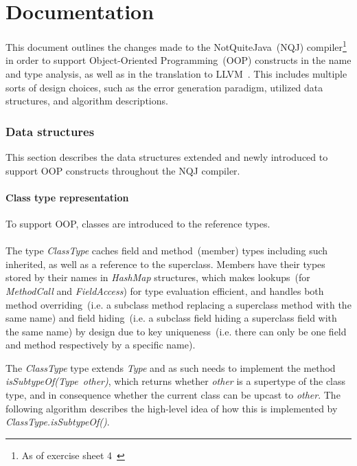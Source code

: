 \documentclass[]{tukportfolio}
\begin{document}

\part*{Documentation}

This document outlines the changes made to the NotQuiteJava~(NQJ) compiler\footnote{
  As of exercise sheet 4~\cite{clp4solution}
} in order to support Object-Oriented Programming~(OOP) constructs in the name and type analysis, as well as in the translation to LLVM~\cite{llvmpage}. This includes multiple sorts of design choices, such as the error generation paradigm, utilized data structures, and algorithm descriptions.

\section{Data structures}

This section describes the data structures extended and newly introduced to support OOP constructs throughout the NQJ compiler.

\subsection{Class type representation}

To support OOP, classes are introduced to the reference types.
\\
\\
The type \textit{ClassType} caches field and method~(member) types including such inherited, as well as a reference to the superclass. Members have their types stored by their names in \textit{HashMap} structures, which makes lookups~(for \textit{MethodCall} and \textit{FieldAccess}) for type evaluation efficient, and handles both method overriding~(i.e. a subclass method replacing a superclass method with the same name) and field hiding~(i.e. a subclass field hiding a superclass field with the same name) by design due to key uniqueness~(i.e. there can only be one field and method respectively by a specific name).

The \textit{ClassType} type extends \textit{Type} and as such needs to implement the method\\\textit{isSubtypeOf(Type~other)}, which returns whether \textit{other} is a supertype of the class type, and in consequence whether the current class can be upcast to \textit{other}. The following algorithm describes the high-level idea of how this is implemented by \textit{ClassType.isSubtypeOf()}.
\end{document}
